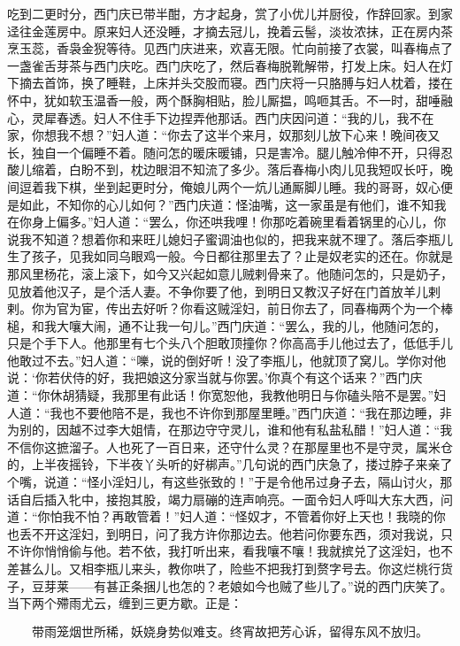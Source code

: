 吃到二更时分，西门庆已带半酣，方才起身，赏了小优儿并厨役，作辞回家。到家迳往金莲房中。原来妇人还没睡，才摘去冠儿，挽着云髻，淡妆浓抹，正在房内茶烹玉蕊，香袅金猊等待。见西门庆进来，欢喜无限。忙向前接了衣裳，叫春梅点了一盏雀舌芽茶与西门庆吃。西门庆吃了，然后春梅脱靴解带，打发上床。妇人在灯下摘去首饰，换了睡鞋，上床并头交股而寝。西门庆将一只胳膊与妇人枕着，搂在怀中，犹如软玉温香一般，两个酥胸相贴，脸儿厮揾，鸣咂其舌。不一时，甜唾融心，灵犀春透。妇人不住手下边捏弄他那话。西门庆因问道：“我的儿，我不在家，你想我不想？”妇人道：“你去了这半个来月，奴那刻儿放下心来！晚间夜又长，独自一个偏睡不着。随问怎的暖床暖铺，只是害冷。腿儿触冷伸不开，只得忍酸儿缩着，白盼不到，枕边眼泪不知流了多少。落后春梅小肉儿见我短叹长吁，晚间逗着我下棋，坐到起更时分，俺娘儿两个一炕儿通厮脚儿睡。我的哥哥，奴心便是如此，不知你的心儿如何？”西门庆道：怪油嘴，这一家虽是有他们，谁不知我在你身上偏多。”妇人道：“罢么，你还哄我哩！你那吃着碗里看着锅里的心儿，你说我不知道？想着你和来旺儿媳妇子蜜调油也似的，把我来就不理了。落后李瓶儿生了孩子，见我如同乌眼鸡一般。今日都往那里去了？止是奴老实的还在。你就是那风里杨花，滚上滚下，如今又兴起如意儿贼剌骨来了。他随问怎的，只是奶子，见放着他汉子，是个活人妻。不争你要了他，到明日又教汉子好在门首放羊儿剌剌。你为官为宦，传出去好听？你看这贼淫妇，前日你去了，同春梅两个为一个棒槌，和我大嚷大闹，通不让我一句儿。”西门庆道：“罢么，我的儿，他随问怎的，只是个手下人。他那里有七个头八个胆敢顶撞你？你高高手儿他过去了，低低手儿他敢过不去。”妇人道：“嚛，说的倒好听！没了李瓶儿，他就顶了窝儿。学你对他说：‘你若伏侍的好，我把娘这分家当就与你罢。’你真个有这个话来？”西门庆道：“你休胡猜疑，我那里有此话！你宽恕他，我教他明日与你磕头陪不是罢。”妇人道：“我也不要他陪不是，我也不许你到那屋里睡。”西门庆道：“我在那边睡，非为别的，因越不过李大姐情，在那边守守灵儿，谁和他有私盐私醋！”妇人道：“我不信你这摭溜子。人也死了一百日来，还守什么灵？在那屋里也不是守灵，属米仓的，上半夜摇铃，下半夜丫头听的好梆声。”几句说的西门庆急了，搂过脖子来亲了个嘴，说道：“怪小淫妇儿，有这些张致的！”于是令他吊过身子去，隔山讨火，那话自后插入牝中，接抱其股，竭力扇磞的连声响亮。一面令妇人呼叫大东大西，问道：“你怕我不怕？再敢管着！”妇人道：“怪奴才，不管着你好上天也！我晓的你也丢不开这淫妇，到明日，问了我方许你那边去。他若问你要东西，须对我说，只不许你悄悄偷与他。若不依，我打听出来，看我嚷不嚷！我就摈兑了这淫妇，也不差甚么儿。又相李瓶儿来头，教你哄了，险些不把我打到赘字号去。你这烂桃行货子，豆芽莱——有甚正条捆儿也怎的？老娘如今也贼了些儿了。”说的西门庆笑了。当下两个殢雨尤云，缠到三更方歇。正是：

\[
带雨笼烟世所稀，妖娆身势似难支。
终宵故把芳心诉，留得东风不放归。
\]

